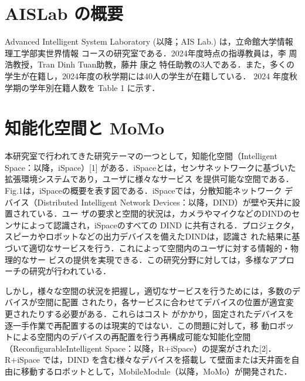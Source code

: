 \documentclass[11pt, a4paper]{jarticle}
\begin{document}
\author{B3 塚 春輝} %
\date{2025/03/11} %

\maketitle %






\section{AISLab の概要}
Advanced Intelligent System Laboratory (以降；AIS Lab.) は，立命館大学情報理工学部実世界情報
コースの研究室である．2024年度時点の指導教員は，李 周浩教授，Tran Dinh Tuan助教，藤井 康之
特任助教の3人である．また，多くの学生が在籍し，2024年度の秋学期には40人の学生が在籍している．
2024 年度秋学期の学年別在籍人数を Table 1 に示す．

\section{知能化空間と MoMo}
本研究室で行われてきた研究テーマの一つとして，知能化空間（Intelligent Space：以降，iSpace）[1]
がある．iSpaceとは，センサネットワークに基づいた拡張環境システムであり，ユーザに様々なサービス
を提供可能な空間である．Fig.1は，iSpaceの概要を表す図である．iSpaceでは，分散知能ネットワーク
デバイス（Distributed Intelligent Network Devices：以降，DIND）が壁や天井に設置されている．ユー
ザの要求と空間的状況は，カメラやマイクなどのDINDのセンサによって認識され，iSpaceのすべての
DIND に共有される．プロジェクタ，スピーカやロボットなどの出力デバイスを備えたDINDは，認識さ
れた結果に基づいて適切なサービスを行う．これによって空間内のユーザに対する情報的・物理的なサー
ビスの提供を実現できる．この研究分野に対しては，多様なアプローチの研究が行われている．

しかし，様々な空間の状況を把握し，適切なサービスを行うためには，多数のデバイスが空間に配置
されたり，各サービスに合わせてデバイスの位置が適宜変更されたりする必要がある．これらはコスト
がかかり，固定されたデバイスを逐一手作業で再配置するのは現実的ではない．この問題に対して，移
動ロボットによる空間内のデバイスの再配置を行う再構成可能な知能化空間（ReconfigurableIntelligent
 Space：以降，R+iSpace）の提案がされた[2]．R+iSpace では，DIND を含む様々なデバイスを搭載し
て壁面または天井面を自由に移動するロボットとして，MobileModule（以降，MoMo）が開発された．
\end{document}
